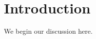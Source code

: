 \documentclass{article}
\begin{document}
\begin{abstract}
This paper explores unresolved issues in modern typesetting.
\end{abstract}

\section{Introduction}

We begin our discussion here.
\end{document}
